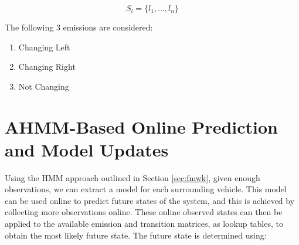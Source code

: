\documentclass[letterpaper, 10 pt, conference]{ieeeconf}  %
\newcommand\NB[1]{$\spadesuit$\footnote{NB: #1}}
\begin{document}
\begin{equation}
    S_l = \{l_1,\ldots,l_n\}    
\end{equation}

The following 3 emissions are considered:

\begin{enumerate}
    \item Changing Left
    \item Changing Right
    \item Not Changing
\end{enumerate}


\section{AHMM-Based Online Prediction and Model Updates} \label{sec:ahmmpredupdate} %
  Using the HMM approach outlined in Section \ref{sec:fmwk}, given enough observations, we can extract a model for each surrounding vehicle. This model can be used online to predict future states of the system, and this is achieved by collecting more observations online. These online observed states can then be applied to the available emission and transition matrices, as lookup tables, to obtain the most likely future state. The future state is determined using:
\end{document}
